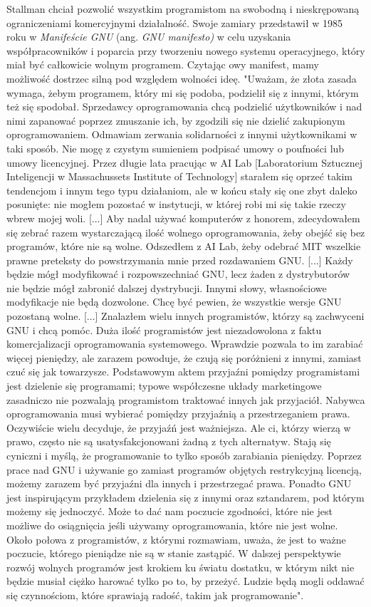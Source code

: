 \documentclass{article}
\begin{document}
Stallman chciał pozwolić wszystkim programistom na swobodną i nieskrępowaną ograniczeniami komercyjnymi działalność. Swoje zamiary przedstawił w 1985 roku w \emph{Manifeście GNU} (ang. \emph{GNU manifesto)} w celu uzyskania współpracowników i poparcia przy tworzeniu nowego systemu operacyjnego, który miał być całkowicie wolnym programem\cite{Kotula}. Czytając owy manifest, mamy możliwość dostrzec silną pod względem wolności ideę. "Uważam, że złota zasada wymaga, żebym programem, który mi się podoba, podzielił się z innymi, którym też się spodobał. Sprzedawcy oprogramowania chcą podzielić użytkowników i nad nimi zapanować poprzez zmuszanie ich, by zgodzili się nie dzielić zakupionym oprogramowaniem. Odmawiam zerwania solidarności z innymi użytkownikami w taki sposób. Nie mogę z czystym sumieniem podpisać umowy o poufności lub umowy licencyjnej. Przez długie lata pracując w AI Lab [Laboratorium Sztucznej Inteligencji w Massachussets Institute of Technology] starałem się oprzeć takim tendencjom i innym tego typu działaniom, ale w końcu stały się one zbyt daleko posunięte: nie mogłem pozostać w instytucji, w której robi mi się takie rzeczy wbrew mojej woli. [...] Aby nadal używać komputerów z honorem, zdecydowałem się zebrać razem wystarczającą ilość wolnego oprogramowania, żeby obejść się bez programów, które nie są wolne. Odszedłem z AI Lab, żeby odebrać MIT wszelkie prawne preteksty do powstrzymania mnie przed rozdawaniem GNU. [...] Każdy będzie mógł modyfikować i rozpowszechniać GNU, lecz żaden z dystrybutorów nie będzie mógł zabronić dalszej dystrybucji. Innymi słowy, własnościowe modyfikacje nie będą dozwolone. Chcę być pewien, że wszystkie wersje GNU pozostaną wolne. [...] Znalazłem wielu innych programistów, którzy są zachwyceni GNU i chcą pomóc. Duża ilość programistów jest niezadowolona z faktu komercjalizacji oprogramowania systemowego. Wprawdzie pozwala to im zarabiać więcej pieniędzy, ale zarazem powoduje, że czują się poróżnieni z innymi, zamiast czuć się jak towarzysze. Podstawowym aktem przyjaźni pomiędzy programistami jest dzielenie się programami; typowe współczesne układy marketingowe zasadniczo nie pozwalają programistom traktować innych jak przyjaciół. Nabywca oprogramowania musi wybierać pomiędzy przyjaźnią a przestrzeganiem prawa. Oczywiście wielu decyduje, że przyjaźń jest ważniejsza. Ale ci, którzy wierzą w prawo, często nie są usatysfakcjonowani żadną z tych alternatyw. Stają się cyniczni i myślą, że programowanie to tylko sposób zarabiania pieniędzy. Poprzez prace nad GNU i używanie go zamiast programów objętych restrykcyjną licencją, możemy zarazem być przyjaźni dla innych i przestrzegać prawa. Ponadto GNU jest inspirującym przykładem dzielenia się z innymi oraz sztandarem, pod którym możemy się jednoczyć. Może to dać nam poczucie zgodności, które nie jest możliwe do osiągnięcia jeśli używamy oprogramowania, które nie jest wolne. Około połowa z programistów, z którymi rozmawiam, uważa, że jest to ważne poczucie, którego pieniądze nie są w stanie zastąpić. W dalszej perspektywie rozwój wolnych programów jest krokiem ku światu dostatku, w którym nikt nie będzie musiał ciężko harować tylko po to, by przeżyć. Ludzie będą mogli oddawać się czynnościom, które sprawiają radość, takim jak programowanie"\cite{gnu.manifest}. 
\end{document}
